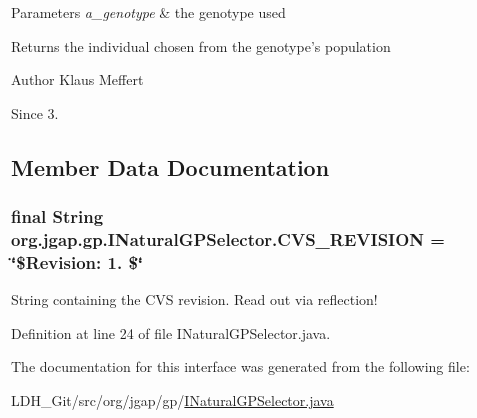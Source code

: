 \begin{DoxyParams}{Parameters}
{\em a\-\_\-genotype} & the genotype used \\
\hline
\end{DoxyParams}
\begin{DoxyReturn}{Returns}
the individual chosen from the genotype's population
\end{DoxyReturn}
\begin{DoxyAuthor}{Author}
Klaus Meffert 
\end{DoxyAuthor}
\begin{DoxySince}{Since}
3. 
\end{DoxySince}


\subsection{Member Data Documentation}
\hypertarget{interfaceorg_1_1jgap_1_1gp_1_1_i_natural_g_p_selector_ae814442f82c4ed08d1097ab11c6ec759}{
\subsubsection[{C\-V\-S\-\_\-\-R\-E\-V\-I\-S\-I\-O\-N}]{\setlength{\rightskip}{0pt plus 5cm}final String org.\-jgap.\-gp.\-I\-Natural\-G\-P\-Selector.\-C\-V\-S\-\_\-\-R\-E\-V\-I\-S\-I\-O\-N = \char`\"{}\$Revision\-: 1. \$\char`\"{}\hspace{0.3cm}{\ttfamily [static]}}}\label{interfaceorg_1_1jgap_1_1gp_1_1_i_natural_g_p_selector_ae814442f82c4ed08d1097ab11c6ec759}
String containing the C\-V\-S revision. Read out via reflection! 

Definition at line 24 of file I\-Natural\-G\-P\-Selector.\-java.



The documentation for this interface was generated from the following file\-:\begin{DoxyCompactItemize}
\item 
L\-D\-H\-\_\-\-Git/src/org/jgap/gp/\hyperlink{_i_natural_g_p_selector_8java}{I\-Natural\-G\-P\-Selector.\-java}\end{DoxyCompactItemize}
